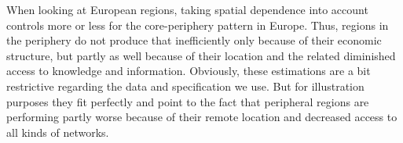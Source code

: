 \documentclass[11pt,parskip,abstracton,notitlepage]{scrartcl}
\begin{document}
When looking at European regions, taking spatial dependence into account controls more or less for the core-periphery pattern in Europe. Thus, regions in the periphery do not produce that inefficiently only because of their economic structure, but partly as well because of their location and the related diminished access to knowledge and information. Obviously, these estimations are a bit restrictive regarding the data and specification we use. But for illustration purposes they fit perfectly and point to the fact that peripheral regions are performing partly worse because of their remote location and decreased access to all kinds of networks.
%
\begin{spacing}{1.2}
	\printbibliography
\end{spacing}
\end{document}
